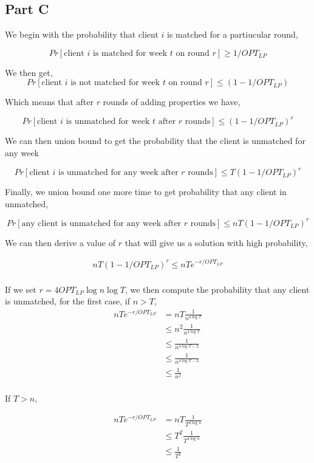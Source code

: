 \documentclass[a4paper]{article}
\begin{document}
\subsection{Part C}

We begin with the probability that client $i$ is matched for a partiucular round, 

$$Pr[\text{client $i$ is matched for week $t$ on round $r$}] \geq 1/OPT_{LP}$$

We then get, 
$$Pr[\text{client $i$ is not matched for week $t$ on round $r$}] \leq (1 - 1/OPT_{LP})$$

Which means that after $r$ rounds of adding properties we have,

$$Pr[\text{client $i$ is unmatched for week $t$ after $r$ rounds}] \leq (1 - 1/OPT_{LP})^r$$

We can then union bound to get the probability that the client is unmatched for any week

$$Pr[\text{client $i$ is unmatched for any week after $r$ rounds}] \leq T(1 - 1/OPT_{LP})^r$$

Finally, we union bound one more time to get probability that any client in unmatched, 

$$Pr[\text{any client is unmatched for any week after $r$ rounds}] \leq nT(1 - 1/OPT_{LP})^r$$

We can then derive a value of $r$ that will give us a solution with high probability, 

\begin{align*}
	nT(1 - 1/OPT_{LP})^r \leq nT e^{-r/OPT_{LP}}\\
\end{align*}

If we set $r = 4 OPT_{LP}\log n \log T$, we then compute the probability that 
any client is unmatched, for the first case, if $n > T$, 
\begin{align*}
	nT e^{-r/OPT_{LP}} &= nT \frac{1}{n^{4\log T}}\\
					&\leq n^2 \frac{1}{n^{4\log T}}\\
					&\leq  \frac{1}{n^{4\log T - 2}}\\
					&\leq  \frac{1}{n^{4\log T - 2}}\\
					&\leq  \frac{1}{n^2}\\
\end{align*}

If $T > n$,

\begin{align*}
	nT e^{-r/OPT_{LP}} &= nT \frac{1}{T^{4\log n}}\\
					&\leq T^2 \frac{1}{T^{4\log n}}\\
					&\leq  \frac{1}{T^2}\\
\end{align*}
\end{document}

